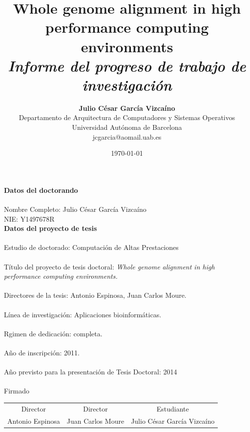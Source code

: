\documentclass[12pt,a4paper]{article}
\title{ {\bf Whole genome alignment in high performance computing environments} \\
\it Informe del progreso de trabajo de investigaci\'on}
\author{ {\bf Julio C\'esar Garc\'ia Vizca\'ino}  \\ 
Departamento de Arquitectura de Computadores y Sistemas Operativos \\ 
Universidad Aut\'onoma de Barcelona\\ 
{\small jcgarcia@aomail.uab.es} 
}
\date{\today}
\begin{document}
\pagestyle{plain}
\maketitle
\pagebreak
{\Huge{\bf Datos del doctorando}}\\
{\Large \\Nombre Completo: Julio César García Vizcaíno\\}
\vspace{0.3cm}
{\Large NIE: Y1497678R\\}
{\Huge{\bf Datos del proyecto de tesis}}\\
\vspace{0.3cm}
{\Large \\Estudio de doctorado: Computación de Altas Prestaciones\\}
\vspace{0.3cm}
{\Large \\Título del proyecto de tesis doctoral: \emph{
Whole genome alignment in high performance computing environments.}\\}
\vspace{0.3cm}
{\Large \\Directores de la tesis: Antonio Espinosa, Juan Carlos Moure.\\}
\vspace{0.3cm}
{\Large \\Línea de investigación: Aplicaciones bioinformáticas.\\}
\vspace{0.3cm}
{\Large \\Rgimen de dedicación: completa.\\}
\vspace{0.3cm}
{\Large \\A\~no de inscripci\'on: 2011.\\}
\vspace{0.3cm}
{\Large \\A\~no previsto para la presentaci\'on de Tesis Doctoral: 2014\\}
\vspace{0.3cm}
{\large \\Firmado\\}
\vspace{2.8cm}
\begin{center}
\begin{tabular}{ c c c }
Director & Director & Estudiante\\
Antonio Espinosa & Juan Carlos Moure & Julio C\'esar García Vizcaíno\\
\end{tabular}
\end{center}
\pagebreak
{}
\end{document}
